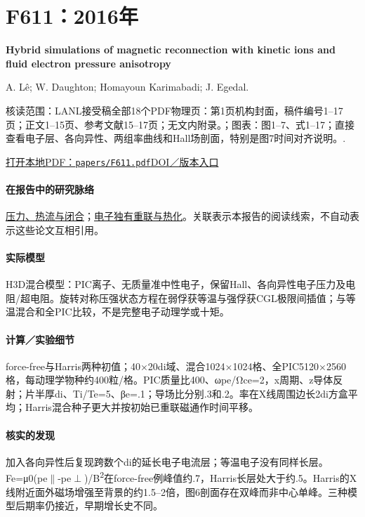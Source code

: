 \section{F611：2016年}\label{paper:F611}

\textbf{Hybrid simulations of magnetic reconnection with kinetic ions and fluid electron pressure anisotropy}\citep{F611}\

A. Lê;  W. Daughton;  Homayoun Karimabadi;  J. Egedal.

\textsf{核读范围：}LANL接受稿全部18个PDF物理页：第1页机构封面，稿件编号1–17页；正文1–15页、参考文献15–17页；无文内附录。；\textsf{图表：}图1–7、式1–17；直接查看电子层、各向异性、两组率曲线和Hall场剖面，特别是图7时间对齐说明。.

\href{run:papers/F611.pdf}{打开本地PDF：\texttt{papers/F611.pdf}}\quad\href{https://doi.org/10.1063/1.4943893}{DOI／版本入口}

\paragraph{在报告中的研究脉络}\hyperref[story:closure]{压力、热流与闭合}；\hyperref[story:energy]{电子独有重联与热化}。关联表示本报告的阅读线索，不自动表示这些论文互相引用。

\paragraph{实际模型}H3D混合模型：PIC离子、无质量准中性电子，保留Hall、各向异性电子压力及电阻/超电阻。旋转对称压强状态方程在弱俘获等温与强俘获CGL极限间插值；与等温混合和全PIC比较，不是完整电子动理学或十矩。

\paragraph{计算／实验细节}force-free与Harris两种初值；40×20di域、混合1024×1024格、全PIC5120×2560格，每动理学物种约400粒/格。PIC质量比400、ωpe/Ωce=2，x周期、z导体反射；片半厚di、Ti/Te=5、βe=.1；导场比分别.3和.2。率在X线周围边长2di方盒平均；Harris混合种子更大并按初始已重联磁通作时间平移。

\paragraph{核实的发现}加入各向异性后复现跨数个di的延长电子电流层；等温电子没有同样长层。Fe=μ0(pe\ensuremath{\parallel}-pe\ensuremath{\perp})/B\textsuperscript{2}在force-free例峰值约.7，Harris长层处大于约.5。Harris的X线附近面外磁场增强至背景的约1.5–2倍，图6剖面存在双峰而非中心单峰。三种模型后期率仍接近，早期增长史不同。

